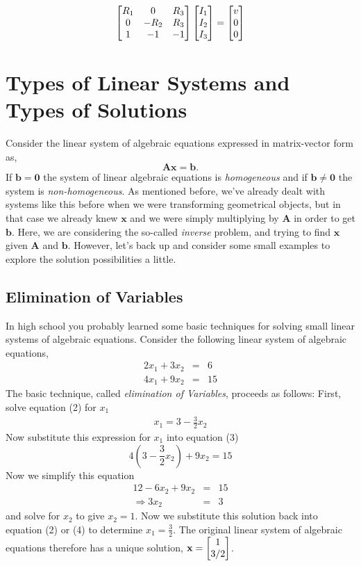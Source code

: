 \begin{sol}
	$$\begin{bmatrix} R_{1} & 0 & R_{3} \\ 0 & -R_{2} & R_{3} \\ 1 & -1 & -1 \end{bmatrix}\begin{bmatrix} I_{1} \\ I_{2} \\ I_{3} \end{bmatrix}=\begin{bmatrix} v \\ 0 \\ 0 \end{bmatrix} $$
\end{sol}

\section{Types of Linear Systems and Types of Solutions}

Consider the linear system of algebraic equations expressed in matrix-vector form as,
\[ \mathbf{A} \mathbf{x} = \mathbf{b}. \]
If $\mathbf{b} = \mathbf{0}$ the system of linear algebraic equations is \textit{homogeneous} and if $\mathbf{b} \ne \mathbf{0}$ the system is \textit{non-homogeneous}. As mentioned before, we've already dealt with systems like this before when we were transforming geometrical objects, but in that case we already knew $\mathbf{x}$ and we were simply multiplying by $\mathbf{A}$ in order to get $\mathbf{b}$. Here, we are considering the so-called \textit{inverse} problem, and trying to find $\mathbf{x}$ given $\mathbf{A}$ and $\mathbf{b}$.
However, let's back up and consider some small examples to explore the solution possibilities a little.

\subsection{Elimination of Variables}
In high school you probably learned some basic techniques for solving small linear systems of algebraic equations. Consider the following linear system of algebraic equations,
\begin{eqnarray}
2 x_1 + 3 x_2 &=& 6 \\
4 x_1 + 9 x_2 &=& 15
\end{eqnarray}
The basic technique, called \textit{elimination of Variables}, proceeds as follows: First, solve equation (2) for $x_1$
\begin{eqnarray}
x_1 = 3 - \frac{3}{2} x_2
\end{eqnarray}
Now substitute this expression for $x_1$ into equation (3)
\[ 4 (3 - \frac{3}{2} x_2) + 9 x_2= 15 \]
Now we simplify this equation
\begin{eqnarray*}
12 - 6 x_2 + 9 x_2 &=& 15 \\
\Rightarrow 3 x_2 &=& 3
\end{eqnarray*}
and solve for $x_2$ to give $x_2 = 1$. Now we substitute this solution back into equation (2) or (4) to determine $x_1 = \frac{3}{2}$. The original linear system of algebraic equations therefore has a unique solution, $\mathbf{x} = \begin{bmatrix} 1 \\ 3/2 \end{bmatrix}$.

